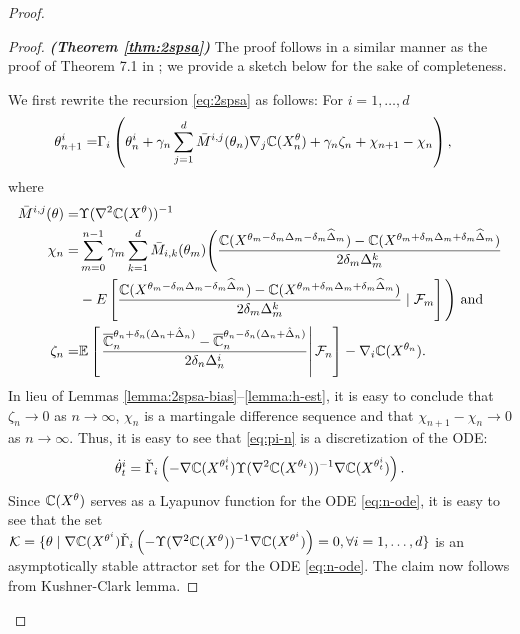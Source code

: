 \begin{proof}
\begin{proof}\textbf{\textit{(Theorem \ref{thm:2spsa})}}
The proof follows in a similar manner as the proof of Theorem 7.1 in \cite{Bhatnagar13SR}; we provide a sketch below for the sake of completeness.

We first rewrite the recursion \eqref{eq:2spsa} as follows:
For $i=1,\ldots, d$
\begin{align}
 \theta^{i}_{n+1} =& \Gamma_{i}\left(\theta^{i}_n + \gamma_n \sum_{j=1}^{d} \bar M^{i,j}(\theta_n) \nabla_{j} \mathbb{C}(X^\theta_n) + \gamma_n \zeta_n + \chi_{n+1} - \chi_n \right), \label{eq:pi-n}
\end{align}
where 
\begin{align*}
\bar M^{i,j}(\theta) = &\Upsilon(\nabla^2 \mathbb{C}(X^{\theta}))^{-1}\\
 \chi_n =& \sum_{m=0}^{n-1} \gamma_m \sum_{k=1}^{d} {\bar{M}}_{i,k}(\theta_m)\Bigg(
\frac{\mathbb{C}(X^{\theta_m-\delta_m\Delta_m - \delta_m\widehat\Delta_m}) -
\mathbb{C}(X^{\theta_m+\delta_m\Delta_m + \delta_m\widehat\Delta_m})}{2\delta_m \Delta^k_m} 
 \\
 &- E\left[\frac{\mathbb{C}(X^{\theta_m-\delta_m\Delta_m - \delta_m\widehat\Delta_m}) -
\mathbb{C}(X^{\theta_m+\delta_m\Delta_m + \delta_m\widehat\Delta_m})}{2\delta_m \Delta^k_m} 
\mid {\cal F}_m\right]\Bigg) \text{ and}\\
\zeta_n = &\mathbb{E}\left[\left.\dfrac{\overline {\mathbb{C}}_n^{\theta_n + \delta_n (\Delta_n + \hat \Delta_n)} -\overline {\mathbb{C}}_n^{\theta_n - \delta_n (\Delta_n + \hat \Delta_n)}}{2 \delta_n \Delta_n^i}\right| \mathcal{F}_n \right] - \nabla_i \mathbb{C}(X^{\theta_n}).
\end{align*}
In lieu of Lemmas \ref{lemma:2spsa-bias}--\ref{lemma:h-est}, it is easy to conclude that $\zeta_n \rightarrow 0$ as $n\rightarrow \infty$, $\chi_n$ is a martingale difference sequence and that $\chi_{n+1} - \chi_n \rightarrow 0$ as $n\rightarrow \infty$. 
Thus, it is easy to see that \eqref{eq:pi-n} is a discretization of the ODE:
\begin{align}
\dot\theta^{i}_t = \check\Gamma_{i}\left(- \nabla \mathbb{C}(X^{\theta^{i}_t}) \Upsilon(\nabla^2 \mathbb{C}(X^{\theta_t}))^{-1} \nabla \mathbb{C}(X^{\theta^{i}_t}) \right).
\label{eq:n-ode}
\end{align}
Since $\mathbb{C}(X^{\theta})$ serves as a Lyapunov function for the ODE \eqref{eq:n-ode}, it is easy to see that the set \\$\mathcal{K} = \{\theta \mid
\nabla \mathbb{C}(X^{\theta^{i}})  \check\Gamma_{i}\left(-\Upsilon(\nabla^2 \mathbb{C}(X^{\theta}))^{-1} \nabla \mathbb{C}(X^{\theta^{i}})\right)
=0, \forall i=1,\ldots,d\}$ is an asymptotically stable attractor set for the ODE \eqref{eq:n-ode}. The claim now follows from Kushner-Clark lemma.
\end{proof}
\end{proof}



